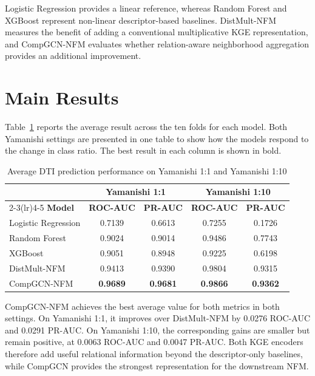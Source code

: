 Logistic Regression provides a linear reference, whereas Random Forest and
XGBoost represent non-linear descriptor-based baselines. DistMult-NFM measures
the benefit of adding a conventional multiplicative KGE representation, and
CompGCN-NFM evaluates whether relation-aware neighborhood aggregation provides
an additional improvement.

\section{Main Results}
\label{sec:main_results}

Table~\ref{tab:main_results} reports the average result across the ten folds for
each model. Both Yamanishi settings are presented in one table to show how the
models respond to the change in class ratio. The best result in each column is
shown in bold.

\begin{table}[H]
\centering
\caption{Average DTI prediction performance on Yamanishi 1:1 and Yamanishi 1:10}
\label{tab:main_results}
\small
\setlength{\tabcolsep}{5pt}
\begin{tabular}{lcccc}
\toprule
& \multicolumn{2}{c}{\textbf{Yamanishi 1:1}} &
\multicolumn{2}{c}{\textbf{Yamanishi 1:10}} \\
\cmidrule(lr){2-3}\cmidrule(lr){4-5}
\textbf{Model} & \textbf{ROC-AUC} & \textbf{PR-AUC} &
\textbf{ROC-AUC} & \textbf{PR-AUC} \\
\midrule
Logistic Regression & 0.7139 & 0.6613 & 0.7255 & 0.1726 \\
Random Forest       & 0.9024 & 0.9014 & 0.9486 & 0.7743 \\
XGBoost             & 0.9051 & 0.8948 & 0.9225 & 0.6198 \\
DistMult-NFM        & 0.9413 & 0.9390 & 0.9804 & 0.9315 \\
CompGCN-NFM         & \textbf{0.9689} & \textbf{0.9681} &
                      \textbf{0.9866} & \textbf{0.9362} \\
\bottomrule
\end{tabular}
\end{table}

CompGCN-NFM achieves the best average value for both metrics in both settings.
On Yamanishi 1:1, it improves over DistMult-NFM by 0.0276 ROC-AUC and 0.0291
PR-AUC. On Yamanishi 1:10, the corresponding gains are smaller but remain
positive, at 0.0063 ROC-AUC and 0.0047 PR-AUC. Both KGE encoders therefore add
useful relational information beyond the descriptor-only baselines, while
CompGCN provides the strongest representation for the downstream NFM.

